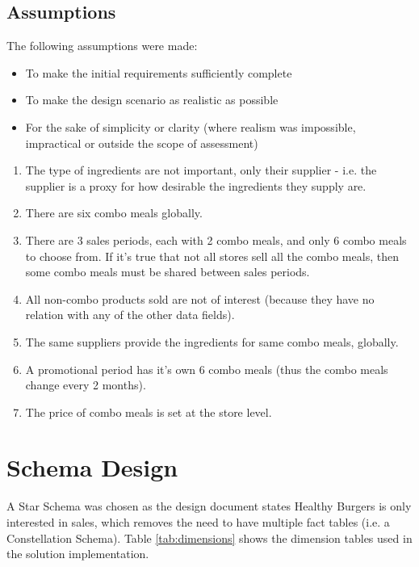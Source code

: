 \documentclass[11pt, a4paper]{article}
\begin{document}
\subsection*{Assumptions}

The following assumptions were made:

\begin{itemize}
	\item To make the initial requirements \cite{designdoc} sufficiently complete
	\item To make the design scenario as realistic as possible 
	\item For the sake of simplicity or clarity (where realism was impossible, impractical or outside the scope of assessment)
\end{itemize}

\begin{enumerate}
	\item The type of ingredients are not important, only their supplier - i.e. the supplier is a proxy for how desirable the ingredients they supply are. 
	\item There are six combo meals globally.
	\item There are 3 sales periods, each with 2 combo meals, and only 6 combo meals to choose from. If it's true that not all stores sell all the combo meals, then some combo meals must be shared between sales periods.
	\item All non-combo products sold are not of interest (because they have no relation with any of the other data fields).
	\item The same suppliers provide the ingredients for same combo meals, globally.
	\item A promotional period has it’s own 6 combo meals (thus the combo meals change every 2 months).
	\item The price of combo meals is set at the store level.
\end{enumerate}

\section*{Schema Design}

A Star Schema was chosen as the design document \cite{designdoc} states Healthy Burgers is only interested in sales, which removes the need to have multiple fact tables (i.e. a Constellation Schema). Table \ref{tab:dimensions} shows the dimension tables used in the solution implementation.
\end{document}
